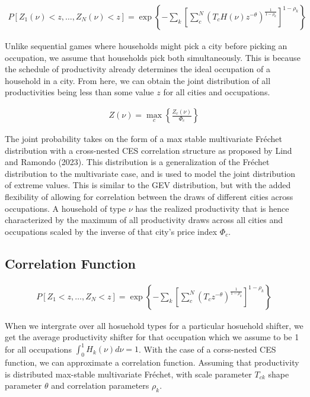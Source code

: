 \documentclass[10pt]{article}
\begin{document}
\begin{align}
    P[Z_1(\nu) < z, \dots, Z_N(\nu) < z] = \exp \left\{ - \sum_{k}^{} \left[ \sum_{c}^{N} (T_c H(\nu) z^{- \theta})^{\frac{1}{1 - \rho_k}} \right]^{1 - \rho_k} \right\}
\end{align}

Unlike sequential games where households might pick a city before picking an occupation, we assume that households pick both simultaneously. This is because the schedule of productivity already determines the ideal occupation of a household in a city. From here, we can obtain the joint distribution of all productivities being less than some value $z$ for all cities and occupations.

\begin{align}
    Z(\nu) = \max_c \left\{ \frac{Z_c (\nu)}{\Phi_c} \right\}
\end{align}

The joint probability takes on the form of a max stable multivariate Fr\'{e}chet distribution with a cross-nested CES correlation structure as proposed by Lind and Ramondo (2023). This distribution is a generalization of the Fr\'{e}chet distribution to the multivariate case, and is used to model the joint distribution of extreme values. This is similar to the GEV distribution, but with the added flexibility of allowing for correlation between the draws of different cities across occupations. A household of type $\nu$ has the realized productivity that is hence characterized by the maximum of all productivity draws across all cities and occupations scaled by the inverse of that city's price index $\Phi_c$.

\subsection{Correlation Function}

\begin{align}
    P[Z_1 < z, \dots, Z_N < z] = \exp \left\{ - \sum_{k}^{} \left[ \sum_{c}^{N} (T_c z^{- \theta})^{\frac{1}{1 - \rho_k}} \right]^{1 - \rho_k} \right\}
\end{align}

When we intergrate over all hosuehold types for a particular hosuehold shifter, we get the average productivity shifter for that occupation which we assume to be 1 for all occupations $\int_{0}^{1} H_k (\nu) d\nu = 1$. With the case of a corss-nested CES function, we can approximate a correlation function. Assuming that productivity is distributed max-stable multivariate Fr\'{e}chet, with scale parameter $T_{ck}$ shape parameter $\theta$ and correlation parameters $\rho_k$.
\end{document}
